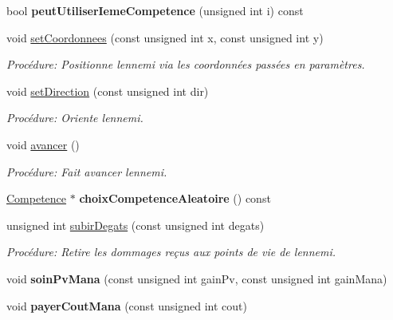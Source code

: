 \begin{DoxyCompactItemize}
bool {\bfseries peut\+Utiliser\+Ieme\+Competence} (unsigned int i) const
\item 
void \mbox{\hyperlink{classEnnemi_ab4f1579490463c3e74ccdf0940247839}{set\+Coordonnees}} (const unsigned int x, const unsigned int y)
\begin{DoxyCompactList}\small\item\em Procédure\+: Positionne l\textquotesingle{}ennemi via les coordonnées passées en paramètres. \end{DoxyCompactList}\item 
void \mbox{\hyperlink{classEnnemi_af263d9340ad6eaa37910a14d06c4ea93}{set\+Direction}} (const unsigned int dir)
\begin{DoxyCompactList}\small\item\em Procédure\+: Oriente l\textquotesingle{}ennemi. \end{DoxyCompactList}\item 
\mbox{\label{classEnnemi_add83496f7fb51ec062e3b9ed1b9a301e}} 
void \mbox{\hyperlink{classEnnemi_add83496f7fb51ec062e3b9ed1b9a301e}{avancer}} ()
\begin{DoxyCompactList}\small\item\em Procédure\+: Fait avancer l\textquotesingle{}ennemi. \end{DoxyCompactList}\item 
\mbox{\label{classEnnemi_a9e0a57618e068224b520f0c9c6054516}} 
\mbox{\hyperlink{structCompetence}{Competence}} $\ast$ {\bfseries choix\+Competence\+Aleatoire} () const
\item 
unsigned int \mbox{\hyperlink{classEnnemi_a44b78c61a2488e440387460470a67fd0}{subir\+Degats}} (const unsigned int degats)
\begin{DoxyCompactList}\small\item\em Procédure\+: Retire les dommages reçus aux points de vie de l\textquotesingle{}ennemi. \end{DoxyCompactList}\item 
\mbox{\label{classEnnemi_aa6608048d84720f0a4fd8215304f54e6}} 
void {\bfseries soin\+Pv\+Mana} (const unsigned int gain\+Pv, const unsigned int gain\+Mana)
\item 
\mbox{\label{classEnnemi_abebfdb3e2be970188cf71d3be0d873ef}} 
void {\bfseries payer\+Cout\+Mana} (const unsigned int cout)
\item 

\end{DoxyCompactItemize}
